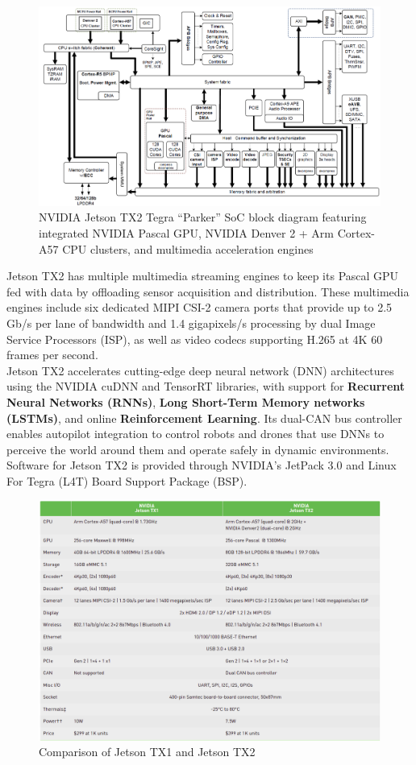         \begin{figure}[H]
            \centering
            \includegraphics[width=0.6\linewidth]{img/tegra.png}
            \caption{NVIDIA Jetson TX2 Tegra “Parker” SoC block diagram featuring integrated NVIDIA Pascal GPU, NVIDIA Denver 2 + Arm Cortex-A57 CPU clusters, and multimedia acceleration engines}
        \end{figure}
        Jetson TX2 has multiple multimedia streaming engines to keep its Pascal GPU fed with data by offloading sensor acquisition and distribution. These multimedia engines include six dedicated MIPI CSI-2 camera ports that provide up to 2.5 Gb/s per lane of bandwidth and 1.4 
        gigapixels/s processing by dual Image Service Processors (ISP), as well as video codecs supporting H.265 at 4K 60 frames per second. \\ 
        \vspace{3mm}
        Jetson TX2 accelerates cutting-edge deep neural network (DNN) architectures using the NVIDIA cuDNN and TensorRT libraries, with support for \textbf{Recurrent Neural Networks (RNNs)}, \textbf{Long Short-Term Memory networks (LSTMs)}, and online \textbf{Reinforcement Learning}. Its dual-CAN bus 
        controller enables autopilot integration to control robots and drones that use DNNs to perceive the world around them and operate safely in dynamic environments. Software for Jetson TX2 is provided through NVIDIA’s JetPack 3.0 and Linux For Tegra (L4T) Board Support Package (BSP).
        \begin{figure}[H]
            \centering
            \includegraphics[width=0.6\linewidth]{img/comparision.png}
            \caption{Comparison of Jetson TX1 and Jetson TX2}
        \end{figure}
